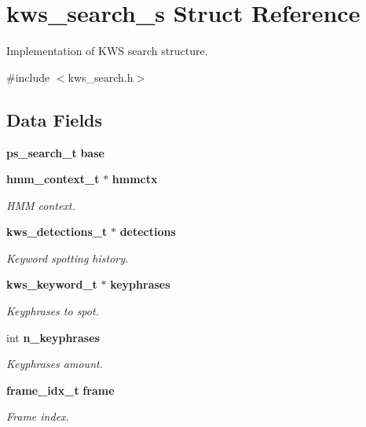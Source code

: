 \section{kws\+\_\+search\+\_\+s Struct Reference}
\label{structkws__search__s}


Implementation of K\+WS search structure.  




{\ttfamily \#include $<$kws\+\_\+search.\+h$>$}

\subsection*{Data Fields}
\begin{DoxyCompactItemize}
\item 
\mbox{\label{structkws__search__s_a2fe82b392de65317a6b616681683942e}} 
\textbf{ ps\+\_\+search\+\_\+t} {\bfseries base}
\item 
\textbf{ hmm\+\_\+context\+\_\+t} $\ast$ \textbf{ hmmctx}
\begin{DoxyCompactList}\small\item\em H\+MM context. \end{DoxyCompactList}\item 
\mbox{\label{structkws__search__s_ac7bd23ef33f85b4173a8d9a7cc9b9a32}} 
\textbf{ kws\+\_\+detections\+\_\+t} $\ast$ \textbf{ detections}
\begin{DoxyCompactList}\small\item\em Keyword spotting history. \end{DoxyCompactList}\item 
\mbox{\label{structkws__search__s_a0eec404435d9f8ad2700487f8a178f48}} 
\textbf{ kws\+\_\+keyword\+\_\+t} $\ast$ \textbf{ keyphrases}
\begin{DoxyCompactList}\small\item\em Keyphrases to spot. \end{DoxyCompactList}\item 
\mbox{\label{structkws__search__s_acd47cbdc3c0708d869888b99e6f5982c}} 
int \textbf{ n\+\_\+keyphrases}
\begin{DoxyCompactList}\small\item\em Keyphrases amount. \end{DoxyCompactList}\item 
\mbox{\label{structkws__search__s_a68a833afd9d01bdf4c2cc640b575eea7}} 
\textbf{ frame\+\_\+idx\+\_\+t} \textbf{ frame}
\begin{DoxyCompactList}\small\item\em Frame index. \end{DoxyCompactList}\item 

\end{DoxyCompactItemize}
